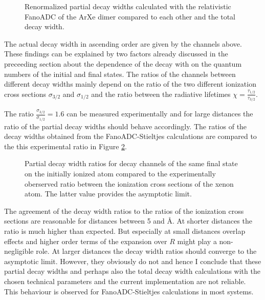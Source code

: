 \begin{figure}[]
  \centering
  
  \caption{Renormalized partial decay widths calculated with the relativistic
           FanoADC of the ArXe dimer compared to each other and the total decay
           width.}
  \label{figure:arxe_rel_fano_partial}
\end{figure}

The actual decay width in ascending
order are given by the channels above.
These findings can be explained by two factors already discussed in the preceeding
section about the dependence of the decay with on the quantum numbers of the
initial and final states. The ratios of the channels between different decay widths
mainly depend on the ratio of the two different ionization cross sections
$\sigma_{3/2}$ and $\sigma_{1/2}$ and the ratio between the radiative lifetimes
$\chi = \frac{\tau_{1/2}}{\tau_{3/2}}$.

The ratio $\frac{\sigma_{3/2}}{\sigma_{1/2}}=1.6$ can be measured experimentally
\cite{Krause81} and for large distances the ratio of the partial decay widths should
behave accordingly. The ratios of the decay widths obtained from the
FanoADC-Stieltjes calculations are compared to the this experimental ratio in
Figure \ref{figure:arxe_rel_fano_ratios_sigma}.
\begin{figure}[]
  \centering
  
  \caption{Partial decay width ratios for decay channels of the same final
           state on the initially ionized atom compared to the experimentally
           oberserved ratio between the ionization cross sections of the xenon
           atom. The latter value provides the asymptotic limit.}
  \label{figure:arxe_rel_fano_ratios_sigma}
\end{figure}

The agreement of the decay width ratios to the ratios of the ionization cross
sections are reasonable for distances between 5 and \unit[10]{\AA}. At shorter
distances the ratio is much higher than expected. But especially at small distances
overlap effects and higher order terms of the expansion over $R$ might play
a non-negligible role. At larger distances the decay width ratios should converge
to the asymptotic limit. However, they obviously do not and hence I conclude
that these partial decay widths and perhaps also the total decay width calculations
with the chosen technical parameters and the current implementation are not
reliable. This behaviour is observed for FanoADC-Stieltjes calculations
\cite{Kolorenc_private,Stumpf_private} in most systems.

